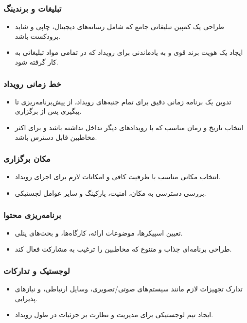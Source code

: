 \subsubsection*{تبلیغات و برندینگ}
\begin{itemize}
	\item طراحی یک کمپین تبلیغاتی جامع که شامل رسانه‌های دیجیتال، چاپی و شاید برودکست باشد.
	\item ایجاد یک هویت برند قوی و به یادماندنی برای رویداد که در تمامی مواد تبلیغاتی به کار گرفته شود.
\end{itemize}

\subsubsection*{خط زمانی رویداد}
\begin{itemize}
	\item تدوین یک برنامه زمانی دقیق برای تمام جنبه‌های رویداد، از پیش‌برنامه‌ریزی تا پیگیری پس از برگزاری.
	\item انتخاب تاریخ و زمان مناسب که با رویدادهای دیگر تداخل نداشته باشد و برای اکثر مخاطبین قابل دسترس باشد.
\end{itemize}

\subsubsection*{مکان برگزاری}
\begin{itemize}
	\item انتخاب مکانی مناسب با ظرفیت کافی و امکانات لازم برای اجرای رویداد.
	\item بررسی دسترسی به مکان، امنیت، پارکینگ و سایر عوامل لجستیکی.
\end{itemize}

\subsubsection*{برنامه‌ریزی محتوا}
\begin{itemize}
	\item تعیین اسپیکرها، موضوعات ارائه، کارگاه‌ها، و بحث‌های پنلی.
	\item طراحی برنامه‌ای جذاب و متنوع که مخاطبین را ترغیب به مشارکت فعال کند.
\end{itemize}

\subsubsection*{لوجستیک و تدارکات}
\begin{itemize}
	\item تدارک تجهیزات لازم مانند سیستم‌های صوتی/تصویری، وسایل ارتباطی، و نیازهای پذیرایی.
	\item ایجاد تیم لوجستیکی برای مدیریت و نظارت بر جزئیات در طول رویداد.
\end{itemize}

